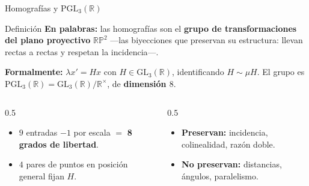 \documentclass[aspectratio=169]{beamer}
\newcommand{\RP}{\mathbb{RP}}
\newcommand{\R}{\mathbb{R}}
\begin{document}
\begin{frame}{Homografías y $\mathrm{PGL}_3(\R)$}
  \begin{block}{Definición}
    \textbf{En palabras:} las homografías son el \textbf{grupo de
    transformaciones del plano proyectivo} $\RP^2$ —las biyecciones que
    preservan su estructura: llevan rectas a rectas y respetan la
    incidencia—.
    \smallskip

    \textbf{Formalmente:} $\lambda x' = Hx$ con $H\in \mathrm{GL}_3(\R)$,
    identificando $H\sim\mu H$. El grupo es
    $\mathrm{PGL}_3(\R)=\mathrm{GL}_3(\R)/\R^\times$, de
    \textbf{dimensión $8$}.
  \end{block}
  \begin{columns}[T]
    \begin{column}{0.5\textwidth}
      \begin{itemize}
        \item $9$ entradas $-1$ por escala $=$ \textbf{8 grados de libertad}.
        \item $4$ pares de puntos en posición general \alert{fijan} $H$.
      \end{itemize}
    \end{column}
    \begin{column}{0.5\textwidth}
      \begin{itemize}
        \item \textbf{Preservan:} incidencia, colinealidad, razón doble.
        \item \textbf{No preservan:} distancias, ángulos, paralelismo.
      \end{itemize}
    \end{column}
  \end{columns}
\end{frame}
\end{document}

